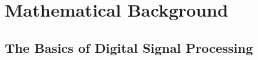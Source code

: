 \chapter{Mathematical Background}\label{chapter:math}


\section{The Basics of Digital Signal Processing}
